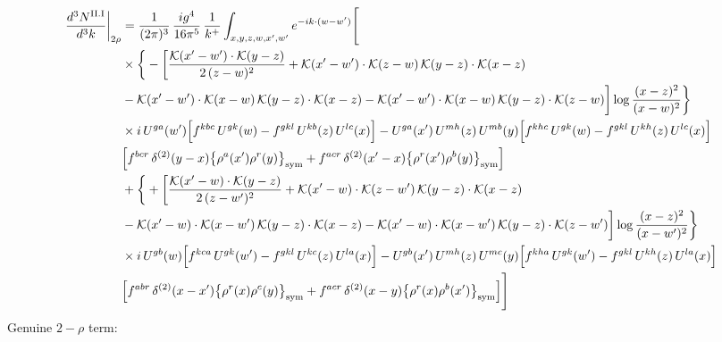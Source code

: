 \documentclass[9pt]{article}
\numberwithin{equation}{section}
\begin{document}
\begin{align}
\frac{d^{3}N^{\rm II.I}}{d^{3}k}\bigg|_{2\rho}&=\frac{1}{(2\pi)^{3}}\,\frac{ig^{4}}{16\pi^{5}}\,\frac{1}{k^{+}}\int_{x,y,z,w,x',w'}e^{-ik\cdot{(w-w')}}\Bigg[\notag\\
&\times\bigg\{-\bigg[\frac{\mathcal{K}(x'-w')\cdot\mathcal{K}(y-z)}{2\,(z-w)^{2}}+\mathcal{K}(x'-w')\cdot\mathcal{K}(z-w)\,\mathcal{K}(y-z)\cdot\mathcal{K}(x-z)\notag\\
&-\mathcal{K}(x'-w')\cdot\mathcal{K}(x-w)\,\mathcal{K}(y-z)\cdot\mathcal{K}(x-z)-\mathcal{K}(x'-w')\cdot\mathcal{K}(x-w)\,\mathcal{K}(y-z)\cdot\mathcal{K}(z-w)\bigg]\log\frac{(x-z)^{2}}{(x-w)^{2}}\bigg\}\notag\\
&\times i\,U^{ga}(w')\Big[f^{kbc}\,U^{gk}(w)-f^{gkl}\,U^{kb}(z)\,U^{lc}(x)\Big]-U^{ga}(x')\,U^{mh}(z)\,U^{mb}(y)\Big[f^{khc}\,U^{gk}(w)-f^{gkl}\,U^{kh}(z)\,U^{lc}(x)\Big]\notag \\ & \Big[f^{bcr}\,\delta^{(2)}(y-x)\big\{\rho^{a}(x')\rho^{r}(y)\big\}_{\rm sym} +f^{acr}\,\delta^{(2)}(x'-x)\big\{\rho^{r}(x')\rho^{b}(y)\big\}_{\rm sym}\Big]\notag\\
&+\bigg\{+\bigg[\frac{\mathcal{K}(x'-w)\cdot\mathcal{K}(y-z)}{2\,(z-w')^{2}}+\mathcal{K}(x'-w)\cdot\mathcal{K}(z-w')\,\mathcal{K}(y-z)\cdot\mathcal{K}(x-z)\notag\\
&-\mathcal{K}(x'-w)\cdot\mathcal{K}(x-w')\,\mathcal{K}(y-z)\cdot\mathcal{K}(x-z)-\mathcal{K}(x'-w)\cdot\mathcal{K}(x-w')\,\mathcal{K}(y-z)\cdot\mathcal{K}(z-w')\bigg]\log\frac{(x-z)^{2}}{(x-w')^{2}}\bigg\}\notag\\
&\times i\,U^{gb}(w)\Big[f^{kca}\,U^{gk}(w')-f^{gkl}\,U^{kc}(z)\,U^{la}(x)\Big]-U^{gb}(x')\,U^{mh}(z)\,U^{mc}(y)\Big[f^{kha}\,U^{gk}(w')-f^{gkl}\,U^{kh}(z)\,U^{la}(x)\Big]\notag \\ & \Big[f^{abr}\,\delta^{(2)}(x-x')\big\{\rho^{r}(x)\rho^{c}(y)\big\}_{\rm sym} +f^{acr}\,\delta^{(2)}(x-y)\big\{\rho^{r}(x)\rho^{b}(x')\big\}_{\rm sym}\Big]\Bigg]\label{eq:D-II.I-2}
\end{align}
Genuine $2-\rho$ term:
\end{document}
